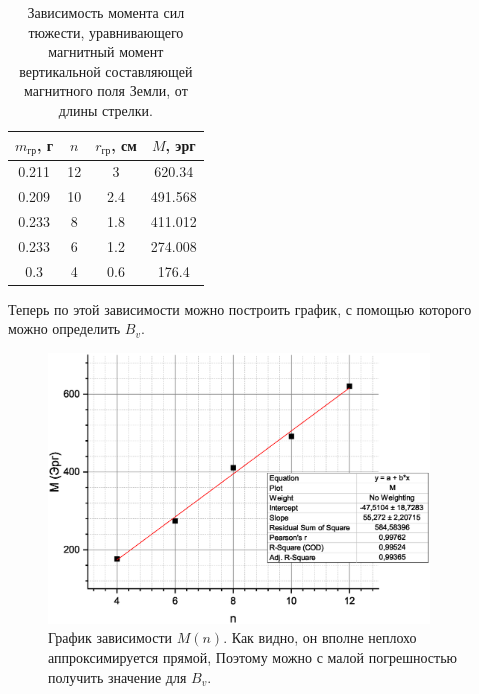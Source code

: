\documentclass[a4paper, 14pt]{extarticle}%
\newcommand\ECaption[1]{%
     \captionsetup{font=footnotesize}%
     \caption{#1}}
\begin{document}
\begin{table}[h]
\begin{center}
\begin{tabular}{|c|c|c|c|}
\hline
\rowcolor[HTML]{9698ED} 
$m_{\text{гр}}$, г & $n$ & $r_{\text{гр}}$, см & $M$, эрг     \\ \hline
0.211           & 12  & 3               & 620.34  \\ \hline
\rowcolor[HTML]{9698ED} 
0.209           & 10  & 2.4             & 491.568 \\ \hline
0.233           & 8   & 1.8             & 411.012 \\ \hline
\rowcolor[HTML]{9698ED} 
0.233           & 6   & 1.2             & 274.008 \\ \hline
0.3             & 4   & 0.6             & 176.4   \\ \hline
\end{tabular}
\ECaption{Зависимость момента сил тюжести, уравнивающего магнитный момент вертикальной составляющей магнитного поля Земли, от длины стрелки. }
\end{center}
\end{table}

Теперь по этой зависимости можно построить график, с помощью которого можно определить $B_v$.

\begin{figure}[h!]
\begin{center}
\includegraphics[width=0.9\textwidth]{grvert}
\end{center}
\ECaption{График зависимости $M(n)$. Как видно, он вполне неплохо аппроксимируется прямой, Поэтому можно с малой погрешностью получить значение для  $B_v$. }
\end{figure}
\end{document}

